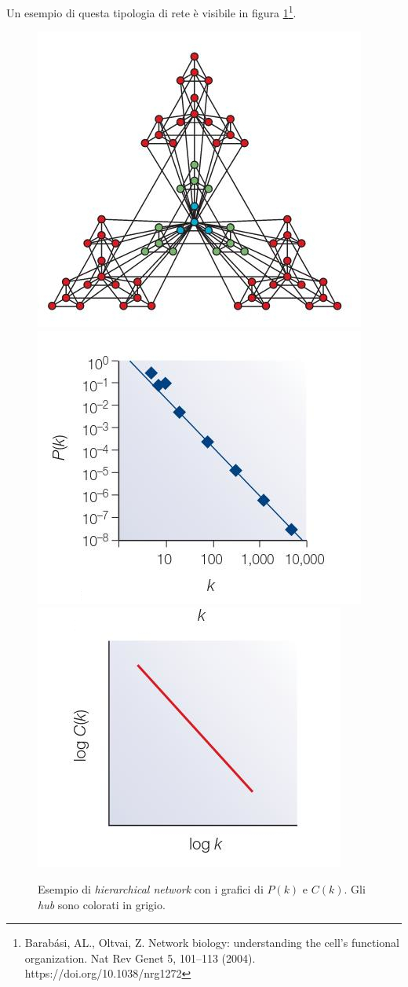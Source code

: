 \documentclass[a4paper,12pt, oneside]{book}
\begin{document}
Un esempio di questa tipologia di rete è visibile in figura
\ref{fig:sfnet2}\footnote{Barabási, AL., Oltvai, Z. Network biology: understanding
  the cell's functional organization. Nat Rev Genet 5, 101–113
  (2004). https://doi.org/10.1038/nrg1272}.
\begin{figure}
  \centering
  \includegraphics[scale = 2.25]{img/hnet1.jpg}\\
  \includegraphics[scale = 1.75]{img/hnet2.jpg}
  \includegraphics[scale = 1.75]{img/hnet3.jpg}
  \caption{Esempio di \textit{hierarchical network} con i grafici di $P(k)$ e
    $C(k)$. Gli \textit{hub} sono colorati in grigio.} 
  \label{fig:sfnet2}
\end{figure}
\end{document}

